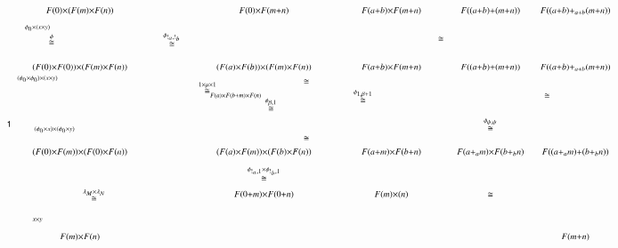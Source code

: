 \documentclass[reqno]{amsart}
\begin{document}
\[
\begin{tikzpicture}[scale=1.6]
\node () at (3,-2.75) {$\scriptstyle{\stackrel{\lambda_M \times \lambda_N}\cong}$};
\node () at (6,-2.375) {$\scriptstyle{\stackrel{\phi_{!_a,1} \times \phi_{!_b,1}}\cong}$};
\node () at (10,-2.75) {$\scriptstyle{\cong}$};
\node () at (9.125,0) {$\scriptstyle{\cong}$};
\node () at (5,-0.85) {$\scriptstyle{\stackrel{1 \times \mu \times 1}\cong}$};
\node () at (6.75,-0.75) {$\scriptstyle{\cong}$};
\node () at (6.125,-1.15) {$\scriptstyle{\stackrel{\phi_{\beta,1}}\cong}$};
\node () at (6.75,-1.75) {$\scriptstyle{\cong}$};
\node () at (7.75,-1) {$\scriptstyle{\stackrel{\phi_{1,\beta+1}}\cong}$};
\node () at (10,-1.5) {$\scriptstyle{\stackrel{\phi_{\psi,\psi}}\cong}$};
\node () at (11,-1) {$\scriptstyle{\cong}$};
\node () at (2.25,0) {$\scriptstyle{\stackrel{\phi}\cong}$};
\node () at (4.375,0) {$\scriptstyle{\stackrel{\phi_{!_a,!_b}}\cong}$};
\node (D) at (1.5,-1.5) {$\scriptstyle{\one}$};
\node (E) at (8.25,0.5) {$\scriptstyle{F(a+b) \times F(m+n)}$};
\node (G) at (2.75,0.5) {$\scriptstyle{F(0) \times (F(m) \times F(n))}$};
\node (G') at (2.75,-0.5) {$\scriptstyle{(F(0) \times F(0)) \times (F(m) \times F(n))}$};
\node (A) at (2.75,-2) {$\scriptstyle{(F(0) \times F(m)) \times (F(0) \times F(n))}$};
\node (A') at (6,-2) {$\scriptstyle{(F(a) \times F(m)) \times (F(b) \times F(n))}$};
\node (L) at (6,-2.75) {$\scriptstyle{F(0+m) \times F(0+n)}$};
\node (L') at (8.25,-2.75) {$\scriptstyle{F(m) \times (n)}$};
\node (A'') at (8.25,-2) {$\scriptstyle{F(a+m) \times F(b+n)}$};
\node (A''') at (10,-2) {$\scriptstyle{F(a+_a m) \times F(b+_b n)}$};
\node  (A'''') at (11.5,-2) {$\scriptstyle{F((a+_a m)+(b+_b n))}$};
\node (H') at (6,-0.5) {$\scriptstyle{(F(a) \times F(b)) \times (F(m) \times F(n))}$};
\node (E') at (8.25,-0.5) {$\scriptstyle{F(a+b) \times F(m+n)}$};
\node (F') at (10,-0.5) {$\scriptstyle{F((a+b)+(m+n))}$};
\node (I') at (11.5,-0.5) {$\scriptstyle{F((a+b)+_{a+b}(m+n))}$};
\node (H) at (6,0.5) {$\scriptstyle{F(0) \times F(m+n)}$};
\node (G'') at (2.75,-3.5) {$\scriptstyle{F(m) \times F(n)}$};
\node (B'') at (11.5,-3.5) {$\scriptstyle{F(m+n)}$};
\node (X) at (2,0.2) {$\scriptscriptstyle{\phi_0 \times (x \times y)}$};
\node (X') at (2,-0.7) {$\scriptscriptstyle{(\phi_0 \times \phi_0) \times (x \times y)}$};
\node (X'') at (2.3,-1.6) {$\scriptscriptstyle{(\phi_0 \times x) \times (\phi_0 \times y)}$};
\node (X'') at (2,-3.2) {$\scriptscriptstyle{x \times y}$};
\node (B) at (10,0.5) {$\scriptstyle{F((a+b)+(m+n))}$};
\node (F) at (11.5,0.5) {$\scriptstyle{F((a+b)+_{a+b}(m+n))}$};
\node (C) at (5.5,-1) {$\scriptscriptstyle{F(a) \times F(b+m) \times F(n)}$};

\end{tikzpicture}\]
\end{document}
